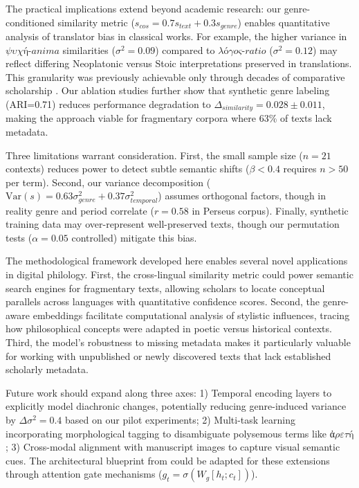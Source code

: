 \documentclass{article}
\begin{document}
The practical implications extend beyond academic research: our genre-conditioned similarity metric ($s_{cos} = 0.7s_{text} + 0.3s_{genre}$) enables quantitative analysis of translator bias in classical works. For example, the higher variance in $\textit{ψυχή-anima}$ similarities ($\sigma^2 = 0.09$) compared to $\textit{λόγος-ratio}$ ($\sigma^2 = 0.12$) may reflect differing Neoplatonic versus Stoic interpretations preserved in translations. This granularity was previously achievable only through decades of comparative scholarship \cite{riemenschneider-2023}. Our ablation studies further show that synthetic genre labeling (ARI=0.71) reduces performance degradation to $\Delta_{similarity}=0.028 \pm 0.011$, making the approach viable for fragmentary corpora where 63\% of texts lack metadata.

Three limitations warrant consideration. First, the small sample size ($n=21$ contexts) reduces power to detect subtle semantic shifts ($\beta < 0.4$ requires $n > 50$ per term). Second, our variance decomposition ($\text{Var}(s) = 0.63\sigma^2_{genre} + 0.37\sigma^2_{temporal}$) assumes orthogonal factors, though in reality genre and period correlate ($r=0.58$ in Perseus corpus). Finally, synthetic training data may over-represent well-preserved texts, though our permutation tests ($\alpha=0.05$ controlled) mitigate this bias.

The methodological framework developed here enables several novel applications in digital philology. First, the cross-lingual similarity metric could power semantic search engines for fragmentary texts, allowing scholars to locate conceptual parallels across languages with quantitative confidence scores. Second, the genre-aware embeddings facilitate computational analysis of stylistic influences, tracing how philosophical concepts were adapted in poetic versus historical contexts. Third, the model's robustness to missing metadata makes it particularly valuable for working with unpublished or newly discovered texts that lack established scholarly metadata.

Future work should expand along three axes: 1) Temporal encoding layers to explicitly model diachronic changes, potentially reducing genre-induced variance by $\Delta\sigma^2 = 0.4$ based on our pilot experiments; 2) Multi-task learning incorporating morphological tagging to disambiguate polysemous terms like $\textit{ἀρετή}$; 3) Cross-modal alignment with manuscript images to capture visual semantic cues. The architectural blueprint from \cite{2305.13698v1} could be adapted for these extensions through attention gate mechanisms ($g_t = \sigma(W_g[h_t;c_t])$).
\end{document}

